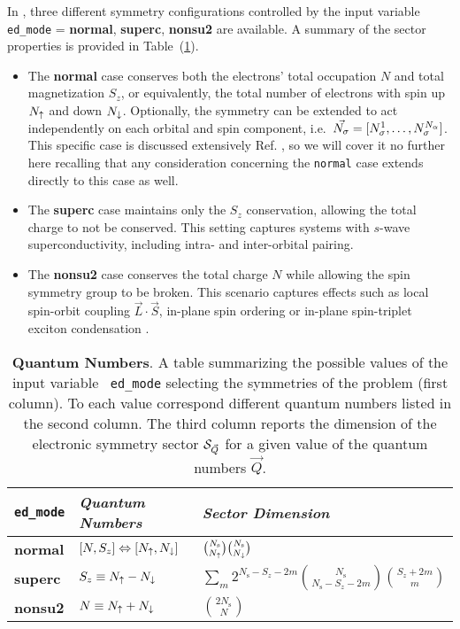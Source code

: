 \documentclass[edipack_sp.tex]{subfiles}
\begin{document}
In \NAME, three different symmetry configurations 
controlled by the input variable {\tt ed\_mode} = {\bf normal}, 
{\bf superc}, {\bf nonsu2} are available. A summary of the sector properties is provided in
Table~(\ref{TabSector}). 

\begin{itemize}
\item{} The {\bf normal} case conserves both the electrons' total occupation $N$
and total magnetization $S_z$, or equivalently, the total number
of electrons with spin up $N_\uparrow$ and down $N_\downarrow$.
Optionally, the symmetry
can be extended to act independently on each orbital and spin
component, i.e.~$\vec{N_\sigma}=[N^1_\sigma,\dots,N^{N_\alpha}_\sigma]$. This
specific case is discussed extensively
Ref. \cite{Amaricci2022CPC}, so we will cover it no further here recalling that any consideration concerning the {\tt normal} case extends directly to this case as well.

%

\item{} The {\bf superc} case maintains only the $S_z$ conservation,
allowing the total charge to not be conserved. This setting captures
systems with $s$-wave superconductivity, including 
intra- and inter-orbital pairing.

\item{} The {\bf nonsu2} case conserves the total
charge $N$ while allowing the spin symmetry group to be broken.
This scenario captures effects such as local spin-orbit coupling
$\vec{L}\cdot\vec{S}$, in-plane spin ordering \cite{BellomiaKMH} or
in-plane spin-triplet exciton condensation \cite{Amaricci2023PRB,Blason2020PRB}.  
\end{itemize}


\begin{table}%
\begin{tabularx}{\linewidth}{ |X|X|X| }
 \hline
  {\tt ed\_mode} & {\it Quantum Numbers} & {\it Sector Dimension} \\
  \hline
  {\bf normal} & $[N,S_z]\Leftrightarrow[N_\uparrow,N_\downarrow]$ &
                                                $\binom{N_\mathrm{s}}{N_\uparrow}\binom{N_\mathrm{s}}{N_\downarrow}$
  \\
  \hline
  {\bf superc} & $S_z\equiv N_\uparrow-N_\downarrow$ &  $\sum_m 2^{N_\mathrm{s}-S_z-2m}\binom{N_\mathrm{s}}{N_\mathrm{s}-S_z-2m}\binom{S_z+2m}{m}$
  \\
  \hline
  {\bf nonsu2} & $N \equiv N_\uparrow+N_\downarrow$ & $\binom{2N_\mathrm{s}}{N}$ \\ 
 \hline  
\end{tabularx}
\vspace{2mm}
\caption{\label{TabSector}
  {\bf Quantum Numbers}.
A table summarizing the possible values of the input variable {\tt
  ed\_mode} selecting the symmetries of the problem (first column). To each value
correspond different quantum numbers listed in the second column.
The third column reports the dimension of the electronic symmetry sector ${\cal S}_{\vec{Q}}$ for a
given value of the quantum numbers $\vec{Q}$.}
\end{table}
\end{document}

